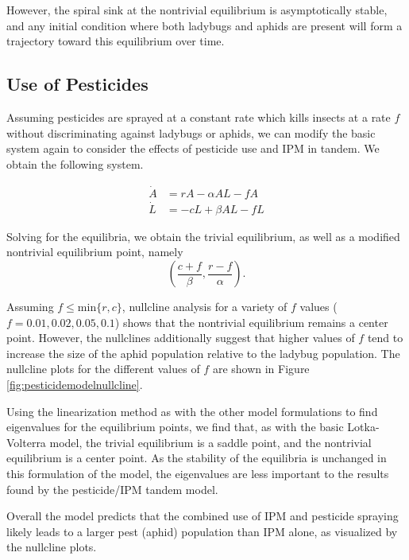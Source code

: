 \documentclass[10pt]{article}
\newcommand{\np}{\vfill\newpage}
\begin{document}
However, the spiral sink at the nontrivial equilibrium is asymptotically stable, and any initial condition where both ladybugs and aphids are present will form a trajectory toward this equilibrium over time.

\subsection{Use of Pesticides}

Assuming pesticides are sprayed at a constant rate which kills insects at a rate \(f\) without discriminating against ladybugs or aphids, we can modify the basic system again to consider the effects of pesticide use and IPM in tandem. We obtain the following system.

\begin{align}
\dot{A} &= rA - \alpha A L -fA \label{eq:pesticideA}\\
\dot{L} &= -cL + \beta A L -fL \label{eq:pesticideL}
\end{align}

Solving for the equilibria, we obtain the trivial equilibrium, as well as a modified nontrivial equilibrium point, namely
\[ \left( \frac{c+f}{\beta}, \frac{r-f}{\alpha} \right). \]

Assuming \(f\leq \mathrm{min}\{r,c\}\), nullcline analysis for a variety of \(f\) values (\(f = 0.01,0.02,0.05,0.1\)) shows that the nontrivial equilibrium remains a center point. However, the nullclines additionally suggest that higher values of \(f\) tend to increase the size of the aphid population relative to the ladybug population. The nullcline plots for the different values of \(f\) are shown in Figure \ref{fig:pesticidemodelnullcline}.

Using the linearization method as with the other model formulations to find eigenvalues for the equilibrium points, we find that, as with the basic Lotka-Volterra model, the trivial equilibrium is a saddle point, and the nontrivial equilibrium is a center point. As the stability of the equilibria is unchanged in this formulation of the model, the eigenvalues are less important to the results found by the pesticide/IPM tandem model.

Overall the model predicts that the combined use of IPM and pesticide spraying likely leads to a larger pest (aphid) population than IPM alone, as visualized by the nullcline plots.

\np
\end{document}

